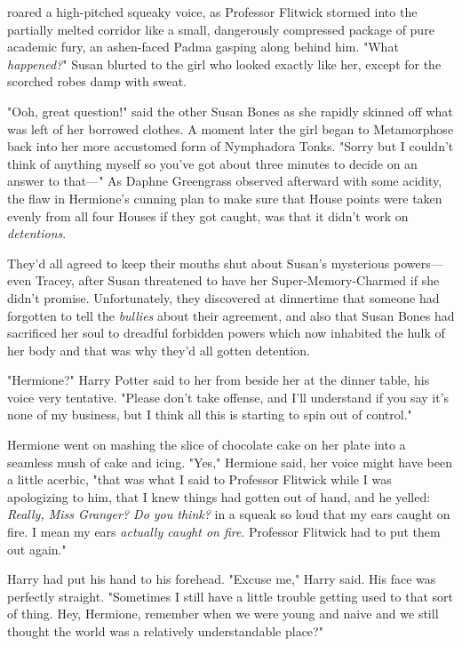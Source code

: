  roared a high-pitched squeaky voice, as Professor
Flitwick stormed into the partially melted corridor like a small, dangerously
compressed package of pure academic fury, an ashen-faced Padma gasping along
behind him.
\sbreak
"What \emph{happened?}" Susan blurted to the girl who looked exactly like her,
except for the scorched robes damp with sweat.

"Ooh, great question!" said the other Susan Bones as she rapidly skinned off
what was left of her borrowed clothes. A moment later the girl began to
Metamorphose back into her more accustomed form of Nymphadora Tonks. "Sorry but
I couldn't think of anything myself so you've got about three minutes to decide
on an answer to that\mbox{---}"
\sbreak
As Daphne Greengrass observed afterward with some acidity, the flaw in
Hermione's cunning plan to make sure that House points were taken evenly from
all four Houses if they got caught, was that it didn't work on
\emph{detentions}.

They'd all agreed to keep their mouths shut about Susan's mysterious
powers---even Tracey, after Susan threatened to have her Super-Memory-Charmed
if she didn't promise. Unfortunately, they discovered at dinnertime that
someone had forgotten to tell the \emph{bullies} about their agreement, and
also that Susan Bones had sacrificed her soul to dreadful forbidden powers
which now inhabited the hulk of her body and that was why they'd all gotten
detention.

"Hermione?" Harry Potter said to her from beside her at the dinner table, his
voice very tentative. "Please don't take offense, and I'll understand if you
say it's none of my business, but I think all this is starting to spin out of
control."

Hermione went on mashing the slice of chocolate cake on her plate into a
seamless mush of cake and icing. "Yes," Hermione said, her voice might have
been a little acerbic, "that was what I said to Professor Flitwick while I was
apologizing to him, that I knew things had gotten out of hand, and he yelled:
\emph{Really, Miss Granger? Do you think?} in a squeak so loud that my ears
caught on fire. I mean my ears \emph{actually caught on fire}. Professor
Flitwick had to put them out again."

Harry had put his hand to his forehead. "Excuse me," Harry said. His face was
perfectly straight. "Sometimes I still have a little trouble getting used to
that sort of thing. Hey, Hermione, remember when we were young and naive and we
still thought the world was a relatively understandable place?"

